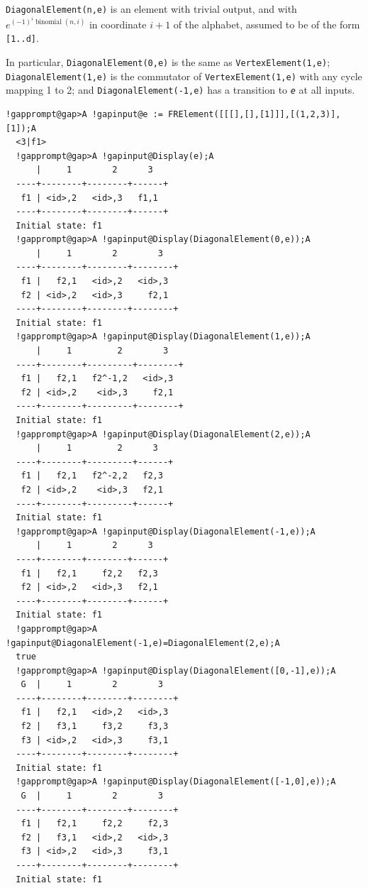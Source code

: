 \documentclass[a4paper,11pt]{report}
\begin{document}
{{{ \texttt{DiagonalElement(n,e)} is an element with trivial output, and with $e^{(-1)^i \mathop{binomial}(n,i)}$ in coordinate $i+1$ of the alphabet, assumed to be of the form \texttt{[1..d]}. 

 In particular, \texttt{DiagonalElement(0,e)} is the same as \texttt{VertexElement(1,e)}; \texttt{DiagonalElement(1,e)} is the commutator of \texttt{VertexElement(1,e)} with any cycle mapping 1 to 2; and \texttt{DiagonalElement(-1,e)} has a transition to \mbox{\texttt{\mdseries\slshape e}} at all inputs. 
\begin{Verbatim}[commandchars=!@A,fontsize=\small,frame=single,label=Example]
  !gapprompt@gap>A !gapinput@e := FRElement([[[],[],[1]]],[(1,2,3)],[1]);A
  <3|f1>
  !gapprompt@gap>A !gapinput@Display(e);A
      |     1        2      3
  ----+--------+--------+------+
   f1 | <id>,2   <id>,3   f1,1
  ----+--------+--------+------+
  Initial state: f1
  !gapprompt@gap>A !gapinput@Display(DiagonalElement(0,e));A
      |     1        2        3
  ----+--------+--------+--------+
   f1 |   f2,1   <id>,2   <id>,3
   f2 | <id>,2   <id>,3     f2,1
  ----+--------+--------+--------+
  Initial state: f1
  !gapprompt@gap>A !gapinput@Display(DiagonalElement(1,e));A
      |     1         2        3
  ----+--------+---------+--------+
   f1 |   f2,1   f2^-1,2   <id>,3
   f2 | <id>,2    <id>,3     f2,1
  ----+--------+---------+--------+
  Initial state: f1
  !gapprompt@gap>A !gapinput@Display(DiagonalElement(2,e));A
      |     1         2      3
  ----+--------+---------+------+
   f1 |   f2,1   f2^-2,2   f2,3
   f2 | <id>,2    <id>,3   f2,1
  ----+--------+---------+------+
  Initial state: f1
  !gapprompt@gap>A !gapinput@Display(DiagonalElement(-1,e));A
      |     1        2      3
  ----+--------+--------+------+
   f1 |   f2,1     f2,2   f2,3
   f2 | <id>,2   <id>,3   f2,1
  ----+--------+--------+------+
  Initial state: f1
  !gapprompt@gap>A !gapinput@DiagonalElement(-1,e)=DiagonalElement(2,e);A
  true
  !gapprompt@gap>A !gapinput@Display(DiagonalElement([0,-1],e));A
   G  |     1        2        3
  ----+--------+--------+--------+
   f1 |   f2,1   <id>,2   <id>,3
   f2 |   f3,1     f3,2     f3,3
   f3 | <id>,2   <id>,3     f3,1
  ----+--------+--------+--------+
  Initial state: f1
  !gapprompt@gap>A !gapinput@Display(DiagonalElement([-1,0],e));A
   G  |     1        2        3
  ----+--------+--------+--------+
   f1 |   f2,1     f2,2     f2,3
   f2 |   f3,1   <id>,2   <id>,3
   f3 | <id>,2   <id>,3     f3,1
  ----+--------+--------+--------+
  Initial state: f1
\end{Verbatim}
 }

}}
\end{document}
